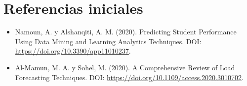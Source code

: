 \documentclass[12pt,a4paper]{article}
\begin{document}
\section{Referencias iniciales}
\begin{itemize}
\item Namoun, A. y Alshanqiti, A. M. (2020). Predicting Student Performance Using Data Mining and Learning Analytics Techniques. DOI: \url{https://doi.org/10.3390/app11010237}.
\item Al-Mamun, M. A. y Sohel, M. (2020). A Comprehensive Review of Load Forecasting Techniques. DOI: \url{https://doi.org/10.1109/access.2020.3010702}.
\end{itemize}
\end{document}
